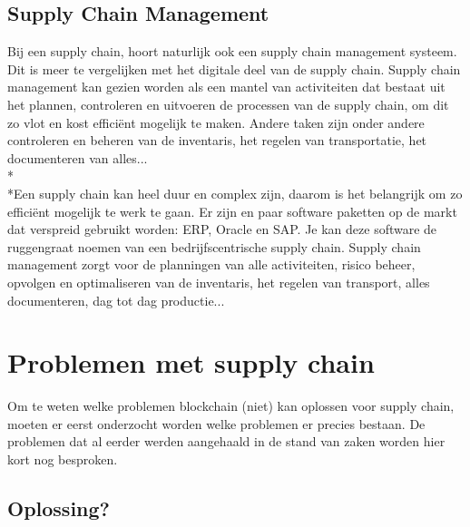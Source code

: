 \documentclass[fleqn,a4paper,12pt]{book}
\begin{document}
\section{Supply Chain Management}
Bij een supply chain, hoort naturlijk ook een supply chain management systeem. Dit is meer te vergelijken met het digitale deel van de supply chain. Supply chain management kan gezien worden als een mantel van activiteiten dat bestaat uit het plannen, controleren en uitvoeren de processen van de supply chain, om dit zo vlot en kost efficiënt mogelijk te maken. Andere taken zijn onder andere controleren en beheren van de inventaris, het regelen van transportatie, het documenteren van alles...\\*\\*Een supply chain kan heel duur en complex zijn, daarom is het belangrijk om zo efficiënt mogelijk te werk te gaan. Er zijn en paar software paketten op de markt dat verspreid gebruikt worden: ERP, Oracle en SAP. Je kan deze software de ruggengraat noemen van een bedrijfscentrische supply chain. Supply chain management zorgt voor de planningen van alle activiteiten, risico beheer, opvolgen en optimaliseren van de inventaris, het regelen van transport, alles documenteren, dag tot dag productie...
~\autocite{scm1}

\chapter{Problemen met supply chain}
Om te weten welke problemen blockchain (niet) kan oplossen voor supply chain, moeten er eerst onderzocht worden welke problemen er precies bestaan. De problemen dat al eerder werden aangehaald in de stand van zaken worden hier kort nog besproken.

\section{Oplossing?}
\end{document}
